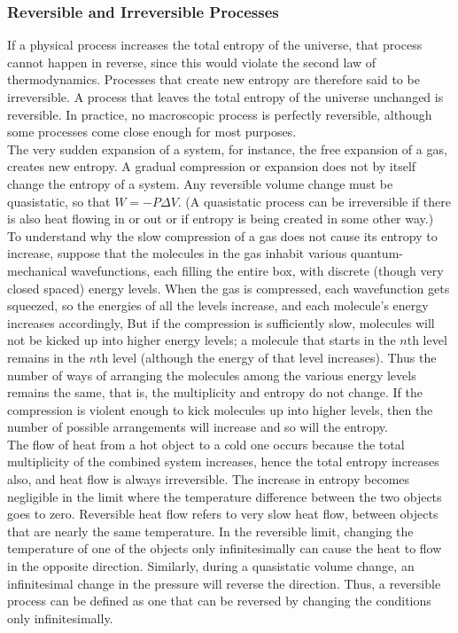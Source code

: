 \documentclass[11pt]{exam}
\begin{document}
\subsubsection*{Reversible and Irreversible Processes}
If a physical process increases the total entropy of the universe, that process cannot happen in reverse, since this would violate the second law of thermodynamics. Processes that create new entropy are therefore said to be irreversible. A process that leaves the total entropy of the universe unchanged is reversible. In practice, no macroscopic process is perfectly reversible, although some processes come close enough for most purposes.\\
\hspace*{10mm}The very sudden expansion of a system, for instance, the free expansion of a gas, creates new entropy. A gradual compression or expansion does not by itself change the entropy of a system. Any reversible volume change must be quasistatic, so that $W=-P\Delta V$. (A quasistatic process can be irreversible if there is also heat flowing in or out or if entropy is being created in some other way.)\\
\hspace*{10mm}To understand why the slow compression of a gas does not cause its entropy to increase, suppose that the molecules in the gas inhabit various quantum-mechanical wavefunctions, each filling the entire box, with discrete (though very closed spaced) energy levels. When the gas is compressed, each wavefunction gets squeezed, so the energies of all the levels increase, and each molecule's energy increases accordingly, But if the compression is sufficiently slow, molecules will not be kicked up into higher energy levels; a molecule that starts in the $n$th level remains in the $n$th level (although the energy of that level increases). Thus the number of ways of arranging the molecules among the various energy levels remains the same, that is, the multiplicity and entropy do not change. If the compression is violent enough to kick molecules up into higher levels, then the number of possible arrangements will increase and so will the entropy.\\
\hspace*{10mm}The flow of heat from a hot object to a cold one occurs because the total multiplicity of the combined system increases, hence the total entropy increases also, and heat flow is always irreversible. The increase in entropy becomes negligible in the limit where the temperature difference between the two objects goes to zero. Reversible heat flow refers to very slow heat flow, between objects that are nearly the same temperature. In the reversible limit, changing the temperature of one of the objects only infinitesimally can cause the heat to flow in the opposite direction. Similarly, during a quasistatic volume change, an infinitesimal change in the pressure will reverse the direction. Thus, a reversible process can be defined as one that can be reversed by changing the conditions only infinitesimally. 
\newpage
\end{document}
